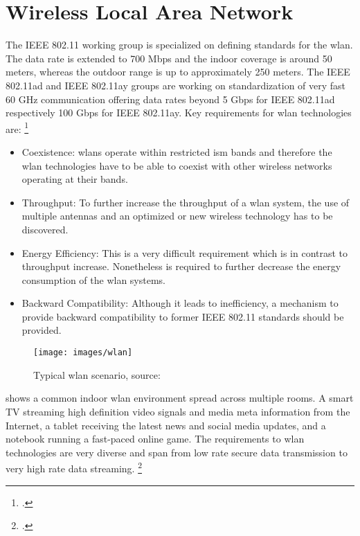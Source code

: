 \section{Wireless Local Area Network}

The IEEE 802.11 working group is specialized on defining standards for the \gls{wlan}. The data rate is extended to 700 Mbps and the indoor coverage is around 50 meters, whereas the outdoor range is up to approximately 250 meters. The IEEE 802.11ad and IEEE 802.11ay groups are working on standardization of very fast 60 GHz communication offering data rates beyond 5 Gbps for IEEE 802.11ad respectively 100 Gbps for IEEE 802.11ay. Key requirements for \gls{wlan} technologies are: \footcite[Cf.][]{Bellalta2015}

\begin{itemize}
  \item Coexistence: \glspl{wlan} operate within restricted \gls{ism} bands and therefore the \gls{wlan} technologies have to be able to coexist with other wireless networks operating at their bands.
  \item Throughput: To further increase the throughput of a \gls{wlan} system, the use of multiple antennas and an optimized or new wireless technology has to be discovered.
  \item Energy Efficiency: This is a very difficult requirement which is in contrast to throughput increase. Nonetheless is required to further decrease the energy consumption of the \gls{wlan} systems.
  \item Backward Compatibility: Although it leads to inefficiency, a mechanism to provide backward compatibility to former IEEE 802.11 standards should be provided.
\end{itemize}

\begin{figure}[ht]
  \centering
  \texttt{[image: images/wlan]}
  \caption{Typical \gls{wlan} scenario, source: \cite{devolo}}
  \label{fig:wlan}
\end{figure}

 shows a common indoor \gls{wlan} environment spread across multiple rooms. A smart TV streaming high definition video signals and media meta information from the Internet, a tablet receiving the latest news and social media updates, and a notebook running a fast-paced online game. The requirements to \gls{wlan} technologies are very diverse and span from low rate secure data transmission to very high rate data streaming. \footcite[Cf.][]{devolo}

